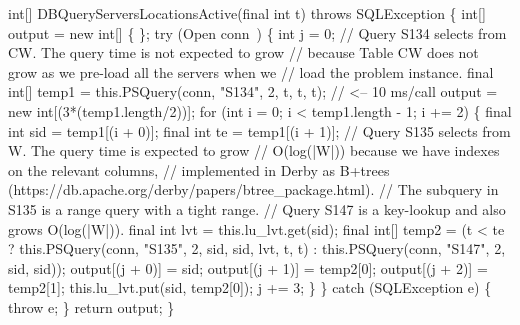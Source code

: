 int[] DBQueryServersLocationsActive(final int t) throws SQLException \{
  int[] output = new int[] \{ \};
  try (\LA{}Open \code{}conn\edoc{}~{\nwtagstyle{}}\RA{}) \{
    int j = 0;
\eatline
{}\nwendcode{}
\nwenddocs{}\plusendmoddef
    // Query S134 selects from CW. The query time is not expected to grow
    // because Table CW does not grow as we pre-load all the servers when we
    // load the problem instance.
    final int[] temp1 = this.PSQuery(conn, "S134", 2, t, t, t);  // <-- 10 ms/call
    output = new int[(3*(temp1.length/2))];
    for (int i = 0; i < temp1.length - 1; i += 2) \{
      final int sid = temp1[(i + 0)];
      final int  te = temp1[(i + 1)];
      // Query S135 selects from W. The query time is expected to grow
      // O(log(|W|)) because we have indexes on the relevant columns,
      // implemented in Derby as B+trees (https://db.apache.org/derby/papers/btree_package.html).
      // The subquery in S135 is a range query with a tight range.
      // Query S147 is a key-lookup and also grows O(log(|W|)).
      final int lvt = this.lu_lvt.get(sid);
      final int[] temp2 = (t < te
        ? this.PSQuery(conn, "S135", 2, sid, sid, lvt, t, t)
        : this.PSQuery(conn, "S147", 2, sid, sid));
      output[(j + 0)] = sid;
      output[(j + 1)] = temp2[0];
      output[(j + 2)] = temp2[1];
      this.lu_lvt.put(sid, temp2[0]);
      j += 3;
    \}
  \} catch (SQLException e) \{
    throw e;
  \}
  return output;
\}
\nwendcode{}\nwdocspar
